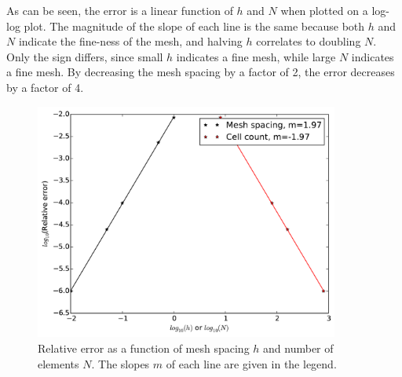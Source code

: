 \documentclass[10pt]{article}
\newcommand*\circled[1]{\tikz[baseline=(char.base)]{
            \node[shape=circle,draw,inner sep=2pt] (char) {#1};}}
\begin{document}
\circled{4}\newline

As can be seen, the error is a linear function of \(h\) and \(N\) when plotted on a log-log plot. The magnitude of the slope of each line is the same because both \(h\) and \(N\) indicate the fine-ness of the mesh, and halving \(h\) correlates to doubling \(N\). Only the sign differs, since small \(h\) indicates a fine mesh, while large \(N\) indicates a fine mesh. By decreasing the mesh spacing by a factor of 2, the error decreases by a factor of 4. 

\begin{figure}[H]
  \centering
  \includegraphics[width=10cm]{Question4.pdf}
  \caption{Relative error as a function of mesh spacing \(h\) and number of elements \(N\). The slopes \(m\) of each line are given in the legend.}
\end{figure}

\circled{5}\newline
\end{document}
